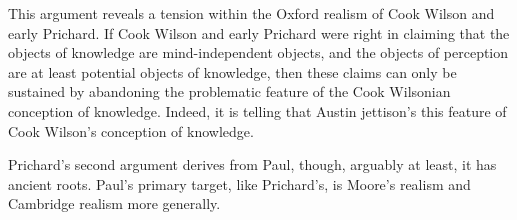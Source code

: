This argument reveals a tension within the Oxford realism of Cook Wilson and early Prichard. If Cook Wilson and early Prichard were right in claiming that the objects of knowledge are mind-independent objects, and the objects of perception are at least potential objects of knowledge, then these claims can only be sustained by abandoning the problematic feature of the Cook Wilsonian conception of knowledge. Indeed, it is telling that Austin jettison's this feature of Cook Wilson's conception of knowledge.

Prichard's second argument derives from Paul, though, arguably at least, it has ancient roots. Paul's primary target, like Prichard's, is Moore's realism and Cambridge realism more generally. %
% 

